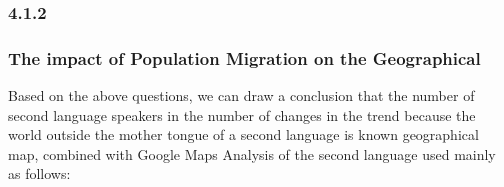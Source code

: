 \subsubsection{4.1.2}

\subsubsection{The impact of Population Migration on the Geographical}
\noindent Based on the above questions, we can draw a conclusion that the number of second language speakers in the number of changes in the trend because the world outside the mother tongue of a second language is known geographical map, combined with Google Maps Analysis of the second language used mainly as follows:

